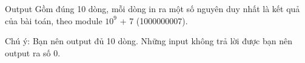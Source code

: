Output
Gồm đúng 10 dòng, mỗi dòng in ra một số nguyên duy nhất là kết quả của bài toán, theo module $10^{9}$ + 7 (1000000007).

Chú ý: Bạn nên output đủ 10 dòng. Những input không trả lời được bạn nên output ra số 0.
\begin{itemize}
\end{itemize}